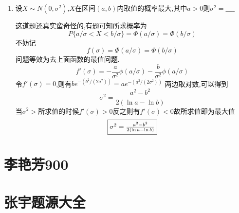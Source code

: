\documentclass[12pt, a4paper, oneside, UTF8]{ctexbook}
\begin{document}
\begin{enumerate}
    \item 设$X\sim N(0,\sigma^2)$,$X$在区间$(a,b)$内取值的概率最大,其中$a>0$则$\sigma^2=\_\_\_\_$
    
    \begin{solution}
        这道题还真实蛮奇怪的,有题可知所求概率为
        $$P\{a/\sigma < X < b/\sigma\}=\Phi(a/\sigma)=\Phi(b/\sigma)$$
        不妨记
        \[
        f(\sigma)=\Phi(a/\sigma)=\Phi(b/\sigma)
        \]
        问题等效为去上面函数的最值问题. 
        \[
            f'(\sigma) = -\frac{a}{\sigma^2}\phi(a/\sigma)-\frac{b}{\sigma^2}\phi(a/\sigma)
        \]
        令$f'(\sigma)=0$,则有$be^{-(b^2/(2\sigma^2))}=ae^{-(a^2/(2\sigma^2))}$
        两边取对数,可以得到 
        \[
        \sigma^2=\frac{a^2-b^2}{2(\ln{a}-\ln{b})}
        \]
        当$\sigma^2>$所求值的时候$f'(\sigma)>0$反之则有$f'(\sigma)<0$故所求值即为最大值 
        \[
        \fbox{$\sigma^2=\frac{a^2-b^2}{2(\ln{a}-\ln{b})}$}
        \]
    \end{solution}
\end{enumerate} 
\section{李艳芳900}

\section{张宇题源大全}

\ifx\allfiles\undefined
\end{document}
